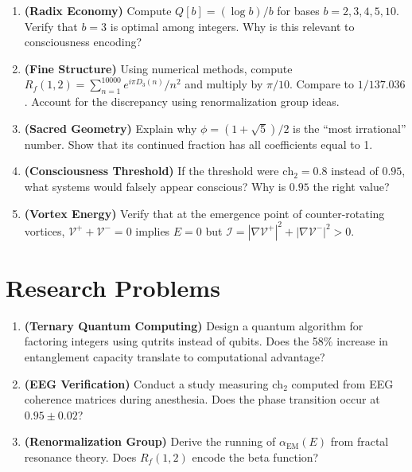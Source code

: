 \begin{enumerate}
\item \textbf{(Radix Economy)} Compute $Q[b] = (\log b)/b$ for bases $b = 2, 3, 4, 5, 10$. Verify that $b = 3$ is optimal among integers. Why is this relevant to consciousness encoding?

\item \textbf{(Fine Structure)} Using numerical methods, compute $R_f(1, 2) = \sum_{n=1}^{10000} e^{i\pi D_3(n)}/n^2$ and multiply by $\pi/10$. Compare to $1/137.036$. Account for the discrepancy using renormalization group ideas.

\item \textbf{(Sacred Geometry)} Explain why $\phi = (1+\sqrt{5})/2$ is the ``most irrational'' number. Show that its continued fraction has all coefficients equal to 1.

\item \textbf{(Consciousness Threshold)} If the threshold were $\text{ch}_2 = 0.8$ instead of $0.95$, what systems would falsely appear conscious? Why is $0.95$ the right value?

\item \textbf{(Vortex Energy)} Verify that at the emergence point of counter-rotating vortices, $\mathcal{V}^+ + \mathcal{V}^- = 0$ implies $E = 0$ but $\mathcal{I} = |\nabla\mathcal{V}^+|^2 + |\nabla\mathcal{V}^-|^2 > 0$.
\end{enumerate}

\section*{Research Problems}

\begin{enumerate}
\item \textbf{(Ternary Quantum Computing)} Design a quantum algorithm for factoring integers using qutrits instead of qubits. Does the 58\% increase in entanglement capacity translate to computational advantage?

\item \textbf{(EEG Verification)} Conduct a study measuring $\text{ch}_2$ computed from EEG coherence matrices during anesthesia. Does the phase transition occur at $0.95 \pm 0.02$?

\item \textbf{(Renormalization Group)} Derive the running of $\alpha_{\text{EM}}(E)$ from fractal resonance theory. Does $R_f(1,2)$ encode the beta function?
\end{enumerate}
